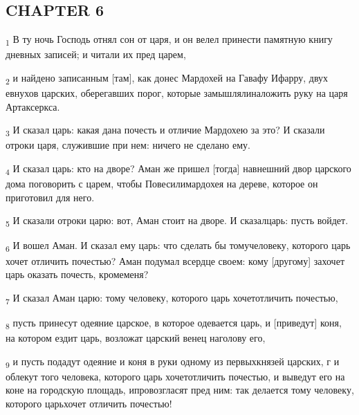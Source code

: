 \subsection{CHAPTER 6}
\begin{tcolorbox}
\textsubscript{1} В ту ночь Господь отнял сон от царя, и он велел принести памятную книгу дневных записей; и читали их пред царем,
\end{tcolorbox}
\begin{tcolorbox}
\textsubscript{2} и найдено записанным [там], как донес Мардохей на Гавафу Ифарру, двух евнухов царских, оберегавших порог, которые замышлялиналожить руку на царя Артаксеркса.
\end{tcolorbox}
\begin{tcolorbox}
\textsubscript{3} И сказал царь: какая дана почесть и отличие Мардохею за это? И сказали отроки царя, служившие при нем: ничего не сделано ему.
\end{tcolorbox}
\begin{tcolorbox}
\textsubscript{4} И сказал царь: кто на дворе? Аман же пришел [тогда] навнешний двор царского дома поговорить с царем, чтобы Повесилимардохея на дереве, которое он приготовил для него.
\end{tcolorbox}
\begin{tcolorbox}
\textsubscript{5} И сказали отроки царю: вот, Аман стоит на дворе. И сказалцарь: пусть войдет.
\end{tcolorbox}
\begin{tcolorbox}
\textsubscript{6} И вошел Аман. И сказал ему царь: что сделать бы томучеловеку, которого царь хочет отличить почестью? Аман подумал всердце своем: кому [другому] захочет царь оказать почесть, кромеменя?
\end{tcolorbox}
\begin{tcolorbox}
\textsubscript{7} И сказал Аман царю: тому человеку, которого царь хочетотличить почестью,
\end{tcolorbox}
\begin{tcolorbox}
\textsubscript{8} пусть принесут одеяние царское, в которое одевается царь, и [приведут] коня, на котором ездит царь, возложат царский венец наголову его,
\end{tcolorbox}
\begin{tcolorbox}
\textsubscript{9} и пусть подадут одеяние и коня в руки одному из первыхкнязей царских, г и облекут того человека, которого царь хочетотличить почестью, и выведут его на коне на городскую площадь, ипровозгласят пред ним: так делается тому человеку, которого царьхочет отличить почестью!
\end{tcolorbox}
